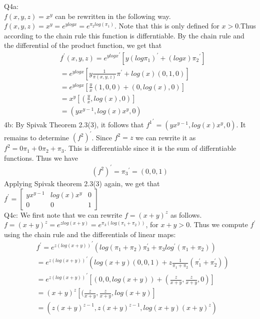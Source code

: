 \documentclass[letterpaper]{article}
\begin{document}
Q4a: \\
$f(x,y,z) = x^y$ can be rewritten in the following way. $f(x,y,z) = x^y = e^{y log x} = e^{\pi_2 log(\pi_1)}$. Note that this is only defined for $x >0$.Thus according to the chain rule this function is differntiable. By the chain rule and the differential of the product function, we get that 
\begin{align*}
   & f^{\prime}(x,y,z) = {e^{ylogx}}^\prime [y {(log \pi_1)}^\prime + (logx) {\pi_2}^\prime]
   \\ & = {e^{ylogx}} [y \frac{1}{\pi(x,y,z)} {\pi}^\prime + log(x)(0,1,0)]
   \\ & = {e^{ylogx}} [\frac{y}{x}(1,0,0) + (0,log(x),0)]
   \\ & = x^y[(\frac{y}{x},log(x),0)]
   \\ & = (yx^{y-1},log(x)x^y,0)
\end{align*}
4b: By Spivak Theorem 2.3(3), it follows that ${f^1}^\prime = (yx^{y-1},log(x)x^y,0)$. It remains to determine $(f^2)^\prime$. Since $f^2 = z$ we can rewrite it as $f^2 = 0\pi_1 + 0\pi_2 + \pi_3$. This is differentiable since it is the sum of differntiable functions. 
Thus we have 
\begin{align*}
    (f^2)^\prime = {\pi_3}^\prime = (0,0,1)
\end{align*}
Applying Spivak theorem 2.3(3) again, we get that $f^\prime=\begin{bmatrix}
    yx^{y-1} & log(x)x^y & 0 \\
            0 & 0 & 1 
    \end{bmatrix}$
\\ Q4c: We first note that we can rewrite $f= (x+y)^z$ as follows. $f= (x+y)^z = e^{zlog(x+y)} = e^{\pi_3(log(\pi_1+\pi_2))}$, for $x+y > 0$. Thus we compute $f^\prime$ using the chain rule and the differentials of linear maps: 
\begin{align*}
    & f^\prime = {e^{z(log(x+y))}}^\prime (log(\pi_1+\pi_2) \pi_3 ^\prime + \pi_3 log^\prime(\pi_1+\pi_2))
    \\ & = {e^{z(log(x+y))}}^\prime (log(x+y)(0,0,1) + z \frac{1}{\pi_1 + \pi_2} (\pi_1^\prime + \pi_2^\prime))
    \\ & = {e^{z(log(x+y))}}^\prime [(0,0,log(x+y))+ (\frac{z}{x+y},\frac{z}{x+y},0)]
    \\ & = (x+y)^z [(\frac{z}{x+y},\frac{z}{x+y}, log(x+y)]
    \\ & = (z(x+y)^{z-1},z(x+y)^{z-1},log(x+y)(x+y)^z)
\end{align*}
\end{document}
